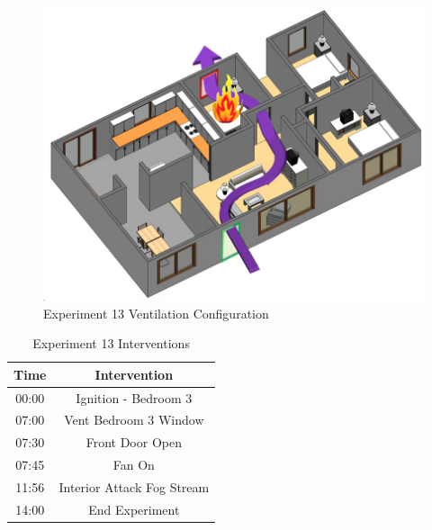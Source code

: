 \documentclass{article}
\begin{document}
\begin{figure}[h!]
	\centering
	\includegraphics[width=5in]{0_Images/FireExperiments/Single_Story/Experiment_13.jpg}
	\caption{Experiment 13 Ventilation Configuration}
	\label{fig:Exp13VentConfig}
\end{figure}

\begin{table}[H]
	\centering
	\caption{Experiment 13 Interventions}
	\begin{tabular}{|c|c|} 
		\hline
		Time & Intervention \\ \hline \hline
		00:00 & Ignition - Bedroom 3\\ \hline
		07:00 & Vent Bedroom 3 Window \\ \hline
		07:30 & Front Door Open \\ \hline
		07:45 & Fan On \\ \hline
		11:56 & Interior Attack Fog Stream \\ \hline
		14:00 & End Experiment \\ \hline
	\end{tabular}
	\label{Table:Exp13Interventions}
\end{table}
\end{document}
